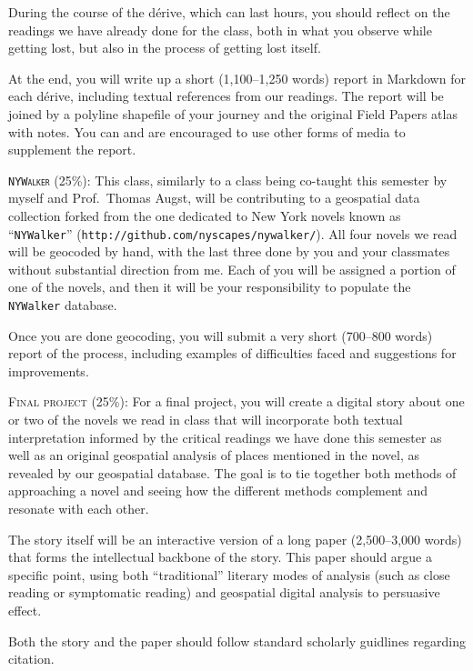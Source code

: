 \begin{description}
    During the course of the dérive, which can last hours, you should reflect
    on the readings we have already done for the class, both in what you
    observe while getting lost, but also in the process of getting lost itself.
    
    At the end, you will write up a short (1,100--1,250 words) report in
    Markdown for each dérive, including textual references from our readings.
    The report will be joined by a polyline shapefile of your journey and the
    original Field Papers atlas with notes. You can and are encouraged to use
    other forms of media to supplement the report.

  \item \textsc{\texttt{NYWalker} (25\%):} This class, similarly to a class
    being co-taught this semester by myself and Prof.\ Thomas Augst, will be
    contributing to a geospatial data collection forked from the one dedicated
    to New York novels known as “\texttt{NYWalker}”
    (\texttt{http://github.com/nyscapes/nywalker/}).  All four novels we read
    will be geocoded by hand, with the last three done by you and your
    classmates without substantial direction from me. Each of you will be
    assigned a portion of one of the novels, and then it will be your
    responsibility to populate the \texttt{NYWalker} database.

    Once you are done geocoding, you will submit a very short (700--800
    words) report of the process, including examples of difficulties faced and
    suggestions for improvements.

  \item \textsc{Final project (25\%):} For a final project, you will create a
    digital story about one or two of the novels we read in class that will
    incorporate both textual interpretation informed by the critical readings
    we have done this semester as well as an original geospatial analysis of
    places mentioned in the novel, as revealed by our geospatial database. The
    goal is to tie together both methods of approaching a novel and seeing how
    the different methods complement and resonate with each other.

    The story itself will be an interactive version of a long paper
    (2,500--3,000 words) that forms the intellectual backbone of the story.
    This paper should argue a specific point, using both “traditional” literary
    modes of analysis (such as close reading or symptomatic reading) and
    geospatial digital analysis to persuasive effect.

    Both the story and the paper should follow standard scholarly guidlines
    regarding citation.

\end{description}
